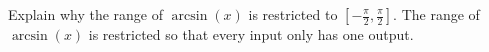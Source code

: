 {Explain why the range of $\arcsin{(x)}$ is restricted to $[-\frac{\pi}{2},\frac{\pi}{2}]$.}
{The range of $\arcsin{(x)}$ is restricted so that every input only has one output.}
